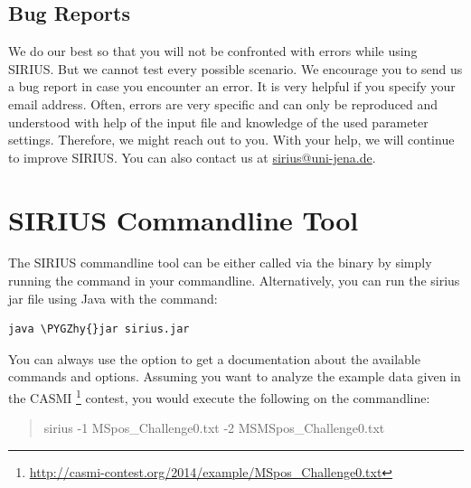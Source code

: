 \documentclass[letterpaper,10pt,openany,oneside]{sphinxmanual}
\newcommand{\todo}[1]{}
\def\PYGZhy{\char`\-}
\begin{document}

\section{Bug Reports}

We do our best so that you will not be confronted with errors while using
SIRIUS.  But we cannot test every possible scenario.  We encourage you to
send us a bug report in case you encounter an error.  It is very helpful if
you specify your email address. Often, errors are very specific and can only
be reproduced and understood with help of the input file and knowledge of the
used parameter settings. Therefore, we might reach out to you. \todo{or add
an upload field?}  With your help, we will continue to improve SIRIUS.  You
can also contact us at \url{sirius@uni-jena.de}.




\chapter{SIRIUS Commandline Tool}
\label{commandline::doc}\label{commandline:sirius-commandline-tool}

\todo{what has changed in here? custom databases?}

The SIRIUS commandline tool can be either called via the binary by simply running the command  in your commandline. Alternatively, you can run the sirius jar file using Java with the command:

\begin{Verbatim}[commandchars=\\\{\}]
java \PYGZhy{}jar sirius.jar
\end{Verbatim}

You can always use the  option to get a documentation about the available commands and options. Assuming you want to analyze the example data given in the CASMI \footnote{\sphinxAtStartFootnote%
\url{http://casmi-contest.org/2014/example/MSpos\_Challenge0.txt}
} contest, you would execute the following on the commandline:
\begin{quote}

sirius -1 MSpos\_Challenge0.txt -2 MSMSpos\_Challenge0.txt
\end{quote}
\end{document}
